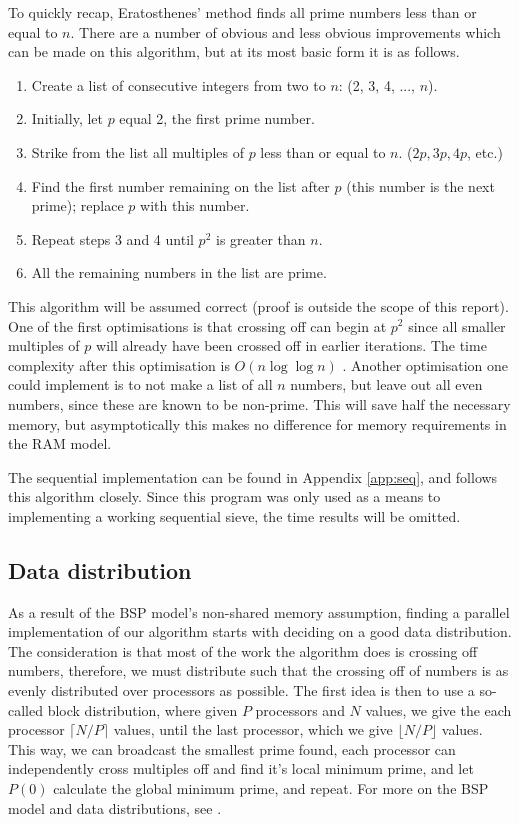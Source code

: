 \documentclass[a4paper]{article}
\begin{document}
To quickly recap, Eratosthenes' method finds all prime numbers less than or
equal to $n$. There are a number of obvious and less
obvious improvements which can be made on this algorithm, but at its most basic
form it is as follows. 

\begin{enumerate}
    \item Create a list of consecutive integers from two to $n$: (2, 3, 4, ...,
        $n$).
    \item Initially, let $p$ equal 2, the first prime number.
    \item Strike from the list all multiples of $p$ less than or equal to $n$.
        ($2p, 3p, 4p$, etc.)
    \item Find the first number remaining on the list after $p$ (this number is
        the next prime); replace $p$ with this number.
    \item Repeat steps 3 and 4 until $p^2$ is greater than $n$.
    \item All the remaining numbers in the list are prime.
\end{enumerate}

This algorithm will be assumed correct (proof is outside the scope of this
report). One of the
first optimisations is that crossing off can begin at $p^2$ since all smaller
multiples of $p$ will already have been crossed off in earlier iterations. The
time complexity after this optimisation is $O(n \log \log n)$ \cite{pp}. Another
optimisation one could implement is to not make a list of all $n$ numbers, but
leave out all even numbers, since these are known to be non-prime. This will
save half the necessary memory, but asymptotically this makes no difference for
memory requirements in the RAM model. 

The sequential implementation can be found in Appendix \ref{app:seq}, and
follows this algorithm closely. Since this program was only used as a means to
implementing a working sequential sieve, the time results will be omitted. 

\subsection{Data distribution}

As a result of the BSP model's non-shared memory assumption,  finding a parallel
implementation of our algorithm starts with deciding on a good data
distribution. The consideration is that most of the work the algorithm does is
crossing off numbers, therefore, we must distribute such that the crossing off
of numbers is as evenly distributed over processors as possible. The first idea
is then to use a so-called block distribution, where given $P$ processors and
$N$ values, we give the each processor $\lceil N/P \rceil$ values, until the
last processor, which we give $\lfloor N/P \rfloor$ values. This way, we can
broadcast the smallest prime found, each processor can independently cross
multiples off and find it's local minimum prime, and let $P(0)$ calculate the
global minimum prime, and repeat. For more on the BSP model and data
distributions, see \cite{biss}.
\end{document}
